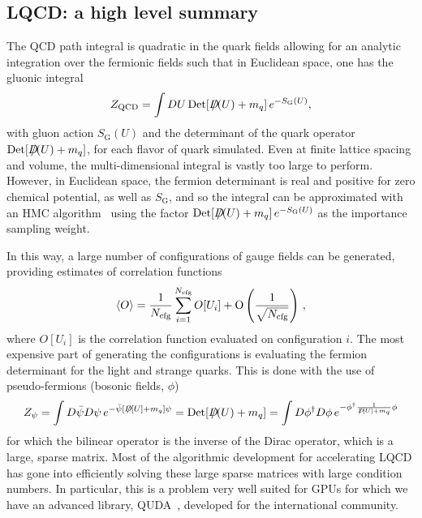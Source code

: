 \documentclass{ar-1col}
\def\Dslash{D\hskip-0.65em /}
\def\Dslashe{D\hskip-0.5em /}
\begin{document}
\subsection{LQCD: a high level summary}
The QCD path integral is quadratic in the quark fields allowing for an analytic integration over the fermionic fields such that in Euclidean space, one has the gluonic integral
\begin{equation}\label{eq:Z_QCD}
Z_{\mathrm{QCD}} = \int D U\, {\rm Det}[\Dslash(U) + m_q]\, e^{-S_{\mathrm{G}}(U)},
\end{equation}
with gluon action $S_{\mathrm{G}}(U)$ and the determinant of the quark operator ${\rm Det}[\Dslash(U) + m_q]$, for each flavor of quark simulated.
Even at finite lattice spacing and volume, the multi-dimensional integral is vastly too large to perform.
However, in Euclidean space, the fermion determinant is real and positive for zero chemical potential, as well as $S_{\mathrm{G}}$, and so the integral can be approximated with an HMC algorithm~\cite{Duane:1987de} using the factor ${\rm Det}[\Dslash(U) + m_q]\, e^{-S_{\mathrm{G}}(U)}$ as the importance sampling weight.%
\begin{marginnote}
\end{marginnote}%
In this way, a large number of configurations of gauge fields can be generated, providing estimates of correlation functions
\begin{equation}
\langle O \rangle = \frac{1}{N_{\rm cfg}}\sum_{i=1}^{N_{\rm cfg}} O[U_i]
    +\mathrm{O}\left(\frac{1}{\sqrt{N_{\rm cfg}}} \right)\, ,
\end{equation}
where $O[U_i]$ is the correlation function evaluated on configuration $i$.
The most expensive part of generating the configurations is evaluating the fermion determinant for the light and strange quarks.
This is done with the use of pseudo-fermions (bosonic fields, $\phi$)
\begin{equation}
Z_\psi = \int D\bar{\psi}D\psi\, e^{-\bar{\psi}[\Dslashe[U]+m_q]\psi}
    = {\rm Det}[\Dslash(U) + m_q]
    = \int D\phi^\dagger D\phi\, e^{-\phi^\dagger \frac{1}{\Dslashe[U]+m_q} \phi}
\end{equation}
for which the bilinear operator is the inverse of the Dirac operator, which is a large, sparse matrix.
Most of the algorithmic development for accelerating LQCD has gone into efficiently solving these large sparse matrices with large condition numbers.  In particular, this is a problem very well suited for GPUs
for which we have an advanced library, QUDA~\cite{Clark:2009wm,Babich:2011np}, developed for the international community.%
\begin{marginnote}
\end{marginnote}%
\end{document}

